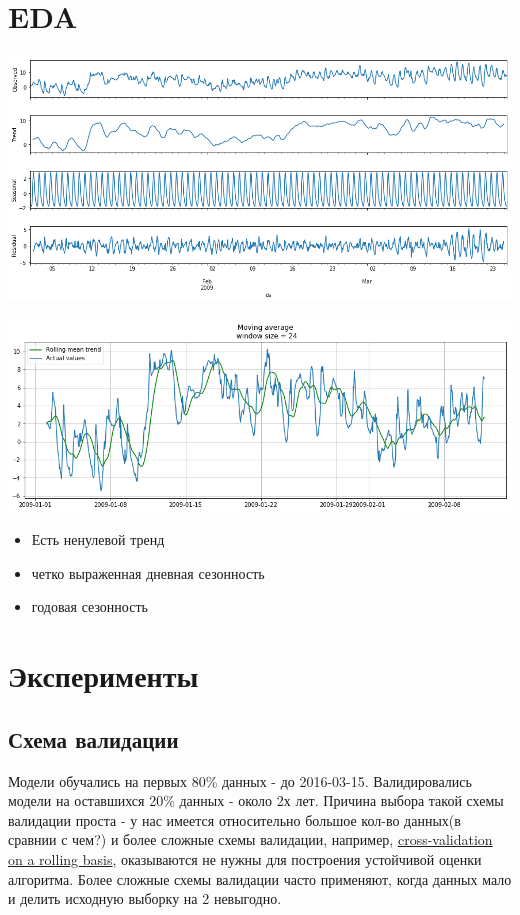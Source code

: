 \documentclass[11pt]{article}
\begin{document}
\section{EDA}
\label{sec:org63b6129}
\begin{center}
\includegraphics[width=15cm]{./pics/sesonal_decomposition.png}
\end{center}
\begin{center}
\includegraphics[width=15cm]{./pics/rolling_mean.png}
\end{center}

\begin{itemize}
\item Есть ненулевой тренд
\item четко выраженная дневная сезонность
\item годовая сезонность
\end{itemize}
\section{Эксперименты}
\label{sec:orga57a3e2}

\subsection{Схема валидации}
\label{sec:org0b2c5ae}
Модели обучались на первых 80\% данных - до 2016-03-15. Валидировались модели на оставшихся 20\% данных - около 2х
лет. Причина выбора такой схемы валидации проста -  у нас имеется относительно большое кол-во данных(в сравнии с чем?) и
более сложные схемы валидации, например, \href{https://habr.com/ru/company/ods/blog/327242/}{cross-validation on a rolling basis}, оказываются не нужны для построения
устойчивой оценки алгоритма. Более сложные схемы валидации часто применяют, когда данных мало и делить исходную выборку
на 2 невыгодно.
\end{document}
